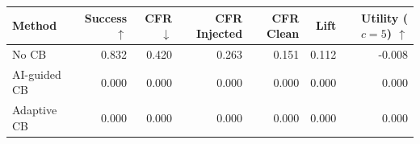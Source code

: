 \begin{tabular}{lrrrrrr}
\toprule
Method & Success $\uparrow$ & CFR $\downarrow$ & CFR Injected & CFR Clean & Lift & Utility ($c=5$) $\uparrow$ \\
\midrule
No CB & 0.832 & 0.420 & 0.263 & 0.151 & 0.112 & -0.008 \\
AI-guided CB & 0.000 & 0.000 & 0.000 & 0.000 & 0.000 & 0.000 \\
Adaptive CB & 0.000 & 0.000 & 0.000 & 0.000 & 0.000 & 0.000 \\
\bottomrule
\end{tabular}
